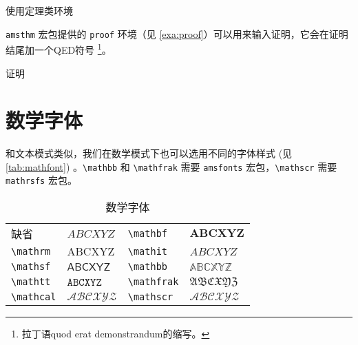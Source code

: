 \begin{example}[h]
\caption{使用定理类环境}
\label{exa:use_theorem}
\end{example}

\texttt{amsthm} 宏包提供的 \texttt{proof} 环境（见 \autoref{exa:proof}）可以用来输入证明，它会在证明结尾加一个QED符号 \footnote{拉丁语quod erat demonstrandum的缩写。}。


\begin{example}[htbp]
\caption{证明}
\label{exa:proof}
\end{example}

\section{数学字体}

和文本模式类似，我们在数学模式下也可以选用不同的字体样式 (见 \autoref{tab:mathfont}) 
。\verb|\mathbb| 和 \verb|\mathfrak| 需要 \texttt{amsfonts} 宏包，\verb|\mathscr| 需要 \texttt{mathrsfs} 宏包。

\begin{table}[htbp]
\caption{数学字体}
\label{tab:mathfont}
\centering
\begin{tabular}{llll}
  \toprule
  缺省 & $ABCXYZ$ & 
  \verb|\mathbf| & $\mathbf{ABCXYZ}$ \\
  \verb|\mathrm| & $\mathrm{ABCXYZ}$ & 
  \verb|\mathit| & $\mathit{ABCXYZ}$ \\
  \verb|\mathsf| & $\mathsf{ABCXYZ}$ & 
  \verb|\mathbb| & $\mathbb{ABCXYZ}$ \\
  \verb|\mathtt| & $\mathtt{ABCXYZ}$ & 
  \verb|\mathfrak| & $\mathfrak{ABCXYZ}$ \\
  \verb|\mathcal| & $\mathcal{ABCXYZ}$ & 
  \verb|\mathscr| & $\mathscr{ABCXYZ}$ \\
  \bottomrule
\end{tabular}
\end{table}



